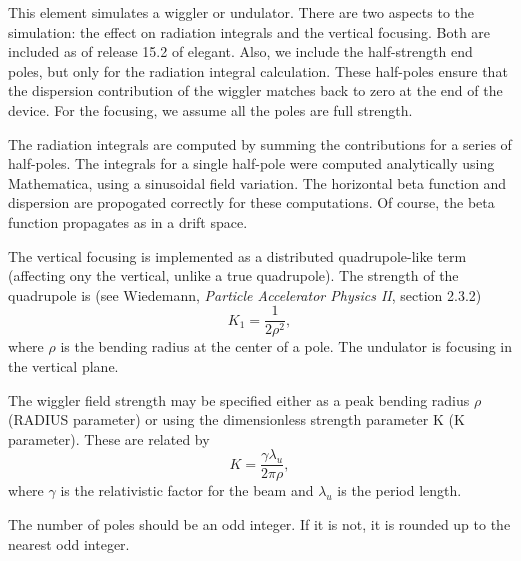 This element simulates a wiggler or undulator.  There are two aspects
to the simulation: the effect on radiation integrals and the vertical
focusing.  Both are included as of release 15.2 of elegant.  Also, we
include the half-strength end poles, but only for the radiation
integral calculation.  These half-poles ensure that the dispersion
contribution of the wiggler matches back to zero at the end of the
device.  For the focusing, we assume all the poles are full strength.

The radiation integrals are computed by summing the contributions for
a series of half-poles.  The integrals for a single half-pole were
computed analytically using Mathematica, using a sinusoidal field
variation.  The horizontal beta function and dispersion are propogated
correctly for these computations.  Of course, the beta function
propagates as in a drift space.

The vertical focusing is implemented as a distributed quadrupole-like
term (affecting ony the vertical, unlike a true quadrupole).  The
strength of the quadrupole is (see Wiedemann, {\em Particle Accelerator
Physics II}, section 2.3.2)
\begin{equation}
K_1 = \frac{1}{2\rho^2},
\end{equation}
where $\rho$ is the bending radius at the center of a pole.  The
undulator is focusing in the vertical plane.

The wiggler field strength may be specified either as a peak bending 
radius $\rho$ (RADIUS parameter) or using the dimensionless strength parameter
K (K parameter).  These are related by
\begin{equation}
K = \frac{\gamma \lambda_u}{2 \pi \rho},
\end{equation}
where $\gamma$ is the relativistic factor for the beam and $\lambda_u$ is
the period length.

The number of poles should be an odd integer.  If it is not, it is rounded up
to the nearest odd integer.
